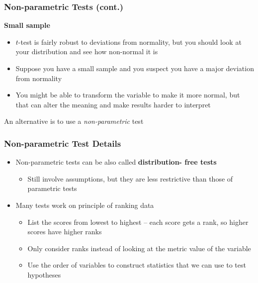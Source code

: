 \documentclass[12pt, block=fill]{beamer}
\begin{document}
\begin{frame}
  \frametitle{Non-parametric Tests (cont.)}
  
  \textbf{Small sample}
  \begin{itemize}
    \item $t$-test is fairly robust to deviations from normality, but you should look at your distribution and see how non-normal it is
    \item Suppose you have a small sample and you suspect you have a major deviation from normality
    \item You might be able to transform the variable to make it more normal, but that can alter the meaning and make results harder to interpret
  \end{itemize}
  
  
  \begin{exampleblock}{An alternative is to use a \textit{non-parametric} test}
    
  \end{exampleblock}
  
    
\end{frame}

\begin{frame}
  \frametitle{Non-parametric Test Details}
  
  \begin{itemize}
      \item Non-parametric tests can be also called \textbf{distribution- free tests}
      \begin{itemize}
          \item Still involve assumptions, but they are less restrictive than those of parametric tests
      \end{itemize}
      \item Many tests work on principle of ranking data
      \begin{itemize}
          \item List the scores from lowest to highest -- each score gets a rank, so higher scores have higher ranks
          \item Only consider ranks instead of looking at the metric value of the variable
          \item Use the order of variables to construct statistics that we can use to test hypotheses
      \end{itemize}
  \end{itemize}
    
\end{frame}
\end{document}
